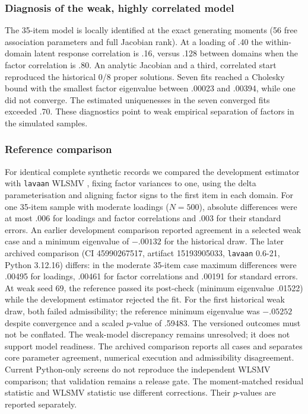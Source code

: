 \subsubsection{Diagnosis of the weak, highly correlated model}
The 35-item model is locally identified at the exact generating moments
(56 free association parameters and full Jacobian rank). At a loading
of .40 the within-domain latent response correlation is .16, versus .128
between domains when the factor correlation is .80. An analytic Jacobian
and a third, correlated start reproduced the historical 0/8 proper
solutions. Seven fits reached a Cholesky bound with the smallest factor
eigenvalue between .00023 and .00394, while one did not converge.
The estimated uniquenesses in the seven converged fits exceeded .70.
These diagnostics point to weak empirical separation of factors in the
simulated samples.

\subsubsection{Reference comparison}
For identical complete synthetic records we compared the development
estimator with \texttt{lavaan} WLSMV \parencite{rosseel2012}, fixing factor
variances to one, using the delta parameterisation and aligning factor
signs to the first item in each domain. For one 35-item sample with
moderate loadings ($N=500$), absolute differences were at most .006 for
loadings and factor correlations and .003 for their standard errors.
An earlier development comparison reported agreement in a selected weak case and a minimum eigenvalue of $-.00132$ for the historical draw. The later archived comparison (CI 45990267517, artifact 15193905033, \texttt{lavaan} 0.6-21, Python 3.12.16) differs: in the moderate 35-item case maximum differences were .00495 for loadings, .00461 for factor correlations and .00191 for standard errors. At weak seed 69, the reference passed its post-check (minimum eigenvalue .01522) while the development estimator rejected the fit. For the first historical weak draw, both failed admissibility; the reference minimum eigenvalue was $-.05252$ despite convergence and a scaled $p$-value of .59483. The versioned outcomes must not be conflated. The weak-model discrepancy remains unresolved; it does not support model readiness. The archived comparison reports all cases and separates core parameter agreement, numerical execution and admissibility disagreement. Current Python-only screens do not reproduce the independent WLSMV comparison; that validation remains a release gate. The moment-matched residual statistic and WLSMV statistic use
different corrections. Their $p$-values are reported separately.



